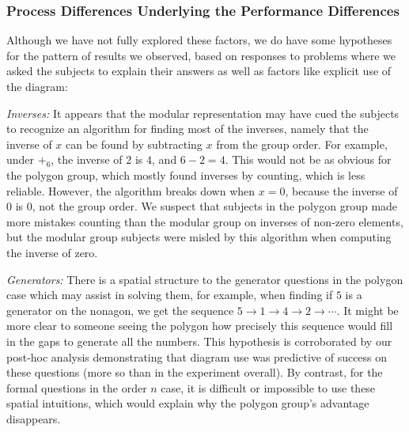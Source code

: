 \documentclass[man,10pt]{apa6}
\begin{document}
\subsubsection{Process Differences Underlying the Performance Differences}
Although we have not fully explored these factors, we do have some hypotheses for the pattern of results we observed, based on responses to problems where we asked the subjects to explain their answers as well as factors like explicit use of the diagram:\par 
\textit{Inverses:} It appears that the modular representation may have cued the subjects to recognize an algorithm for finding most of the inverses, namely that the inverse of $x$ can be found by subtracting $x$ from the group order. For example, under $+_6$, the inverse of $2$ is $4$, and $6-2 = 4$. This would not be as obvious for the polygon group, which mostly found inverses by counting, which is less reliable. However, the algorithm breaks down when $x = 0$, because the inverse of $0$ is $0$, not the group order. We suspect that subjects in the polygon group made more mistakes counting than the modular group on inverses of non-zero elements, but the modular group subjects were misled by this algorithm when computing the inverse of zero. \par
\textit{Generators:} There is a spatial structure to the generator questions in the polygon case which may assist in solving them, for example, when finding if $5$ is a generator on the nonagon, we get the sequence $5 \rightarrow 1 \rightarrow 4 \rightarrow 2 \rightarrow \cdots$. It might be more clear to someone seeing the polygon how precisely this sequence would fill in the gaps to generate all the numbers. This hypothesis is corroborated by our post-hoc analysis demonstrating that diagram use was predictive of success on these questions (more so than in the experiment overall). By contrast, for the formal questions in the order $n$ case, it is difficult or impossible to use these spatial intuitions, which would explain why the polygon group's advantage disappears.
\end{document}

